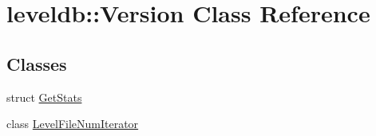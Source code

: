 \hypertarget{classleveldb_1_1_version}{}\section{leveldb\+::Version Class Reference}
\label{classleveldb_1_1_version}
\subsection*{Classes}
\begin{DoxyCompactItemize}
\item 
struct \mbox{\hyperlink{structleveldb_1_1_version_1_1_get_stats}{Get\+Stats}}
\item 
class \mbox{\hyperlink{classleveldb_1_1_version_1_1_level_file_num_iterator}{Level\+File\+Num\+Iterator}}
\end{DoxyCompactItemize}
